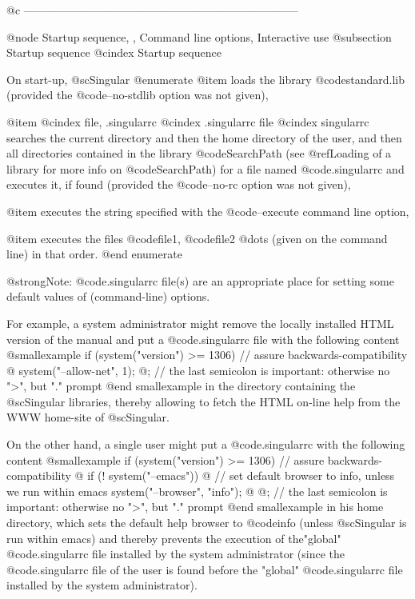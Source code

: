 @c --------------------------------------------------------------------------

@node Startup sequence, , Command line options, Interactive use
@subsection Startup sequence
@cindex Startup sequence

On start-up, @sc{Singular}
@enumerate
@item
loads the library @code{standard.lib} (provided the @code{--no-stdlib}
option was not given),

@item
@cindex file, .singularrc
@cindex .singularrc file
@cindex singularrc
searches the current directory and then the
home directory of the user, and then all directories contained in the
library @code{SearchPath} (see @ref{Loading of a library} for more info
on @code{SearchPath}) for a file named @code{.singularrc} and
executes it, if found (provided the @code{--no-rc} option was not
given),

@item
executes the string specified with the @code{--execute} command line
option,

@item
executes the files @code{file1}, @code{file2} @dots{}  (given on the command
line) in that order.
@end enumerate

@strong{Note:} @code{.singularrc} file(s) are an appropriate place for
setting some default values of (command-line) options.

For example, a system administrator might remove the locally installed
HTML version of the manual and put a @code{.singularrc} file
with the following content
@smallexample
if (system("version") >= 1306) // assure backwards-compatibility
@{
  system("--allow-net", 1);
@}; // the last semicolon is important: otherwise no ">", but "." prompt
@end smallexample
in the directory containing the @sc{Singular} libraries, thereby
allowing to fetch the HTML on-line help from the WWW home-site of
@sc{Singular}.

On the other hand, a single user might put a @code{.singularrc} with the
following content
@smallexample
if (system("version") >= 1306) // assure backwards-compatibility
@{
  if (! system("--emacs"))
  @{
    // set default browser to info, unless we run within emacs
    system("--browser", "info");
  @}
@}; // the last semicolon is important: otherwise no ">", but "." prompt
@end smallexample
in his home directory, which sets the default help browser to
@code{info} (unless @sc{Singular} is run within emacs) and thereby
prevents the execution of the"global"
@code{.singularrc} file installed by the system administrator (since the
@code{.singularrc} file of the user is found before the "global"
@code{.singularrc} file installed by the system administrator).

